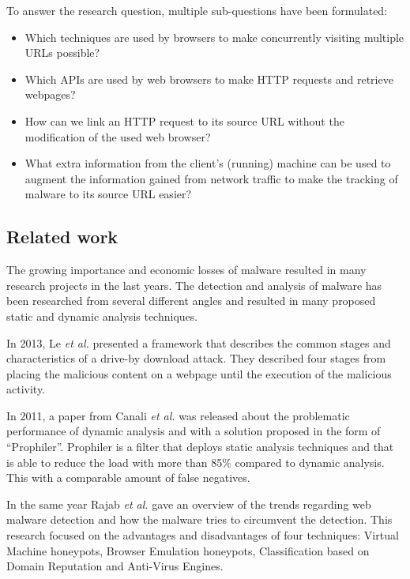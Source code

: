 To answer the research question, multiple sub-questions have been formulated:

\begin{itemize}
\item Which techniques are used by browsers to make concurrently visiting multiple URLs possible?
\item Which APIs are used by web browsers to make HTTP requests and retrieve webpages?
\item How can we link an HTTP request to its source URL without the modification of the used web browser?
\item What extra information from the client's (running) machine can be used to augment the information gained from network traffic to make the tracking of malware to its source URL easier?
\end{itemize}


\subsection{Related work}

The growing importance and economic losses of malware resulted in many research projects in the last years. The detection and analysis of malware has been researched from several different angles \cite{auto_malware,Chang2013} and resulted in many proposed static and dynamic analysis techniques.

In 2013, Le \textit{et al.} \cite{Le2013} presented a framework that describes the common stages and characteristics of a drive-by download attack. They described four stages from placing the malicious content on a webpage until the execution of the malicious activity.

In 2011, a paper from Canali \textit{et al.} \cite{Canali2011} was released about the problematic performance of dynamic analysis and with a solution proposed in the form of ``Prophiler''. Prophiler is a filter that deploys static analysis techniques and that is able to reduce the load with more than 85\% compared to dynamic analysis. This with a comparable amount of false negatives.

In the same year Rajab \textit{et al.} \cite{Rajab11trendsin} gave an overview of the trends regarding web malware detection and how the malware tries to circumvent the detection. This research focused on the advantages and disadvantages of four techniques: Virtual Machine honeypots, Browser Emulation honeypots, Classification based on Domain Reputation and Anti-Virus Engines.

